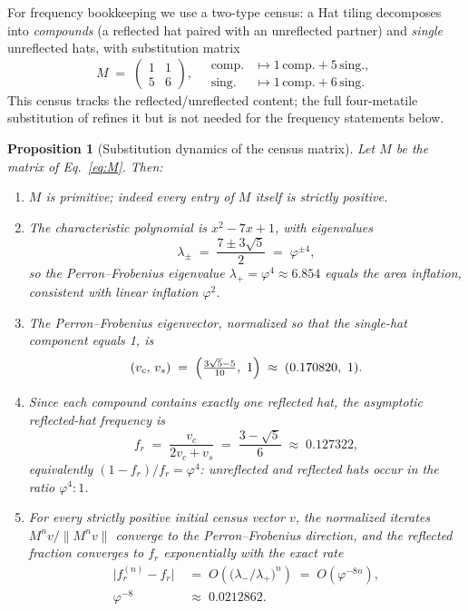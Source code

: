 \documentclass[a4paper,unpublished]{quantumarticle}
\newtheorem{proposition}[theorem]{Proposition}
\theoremstyle{remark}
\newcommand{\gphi}{\varphi}
\begin{document}
For frequency bookkeeping we use a two-type census: a Hat tiling
decomposes into \emph{compounds} (a reflected hat paired with an
unreflected partner) and \emph{single} unreflected hats, with
substitution matrix
\begin{equation}
M \;=\; \begin{pmatrix} 1 & 1 \\ 5 & 6 \end{pmatrix},
\quad
\begin{aligned}
\text{comp.} &\mapsto 1\,\text{comp.} + 5\,\text{sing.},\\
\text{sing.} &\mapsto 1\,\text{comp.} + 6\,\text{sing.}
\end{aligned}
\label{eq:M}
\end{equation}
This census tracks the reflected/unreflected content; the full
four-metatile substitution of \cite{Smith2024hat} refines it but is
not needed for the frequency statements below.

\begin{proposition}[Substitution dynamics of the census matrix]
\label{prop:PF}
Let $M$ be the matrix of Eq.~\eqref{eq:M}. Then:
\begin{enumerate}
\item $M$ is primitive; indeed every entry of $M$ itself is strictly
positive.
\item The characteristic polynomial is $x^{2} - 7x + 1$, with
eigenvalues
\[
\lambda_{\pm} \;=\; \frac{7 \pm 3\sqrt{5}}{2} \;=\; \gphi^{\pm 4},
\]
so the Perron--Frobenius eigenvalue $\lambda_{+} = \gphi^{4} \approx
6.854$ equals the area inflation, consistent with linear inflation
$\gphi^{2}$.
\item The Perron--Frobenius eigenvector, normalized so that the
single-hat component equals 1, is
\[
(v_{c},\, v_{s}) \;=\; \Bigl( \tfrac{3\sqrt{5}-5}{10},\ 1 \Bigr)
\;\approx\; (0.170820,\ 1).
\]
\item Since each compound contains exactly one reflected hat, the
asymptotic reflected-hat frequency is
\begin{equation}
f_{r} \;=\; \frac{v_{c}}{2 v_{c} + v_{s}}
\;=\; \frac{3 - \sqrt{5}}{6} \;\approx\; 0.127322 ,
\label{eq:fr}
\end{equation}
equivalently $(1-f_{r})/f_{r} = \gphi^{4}$: unreflected and reflected
hats occur in the ratio $\gphi^{4} : 1$.
\item For every strictly positive initial census vector $v$, the
normalized iterates $M^{n} v / \lVert M^{n} v \rVert$ converge to the
Perron--Frobenius direction, and the reflected fraction converges to
$f_{r}$ exponentially with the exact rate
\begin{equation}
\begin{aligned}
\bigl| f_{r}^{(n)} - f_{r} \bigr|
&\;=\; O\!\left( \bigl( \lambda_{-}/\lambda_{+} \bigr)^{n} \right)
\;=\; O\!\left( \gphi^{-8n} \right),\\[2pt]
\gphi^{-8} &\;\approx\; 0.0212862 .
\end{aligned}
\label{eq:rate}
\end{equation}
\end{enumerate}
\end{proposition}
\end{document}
